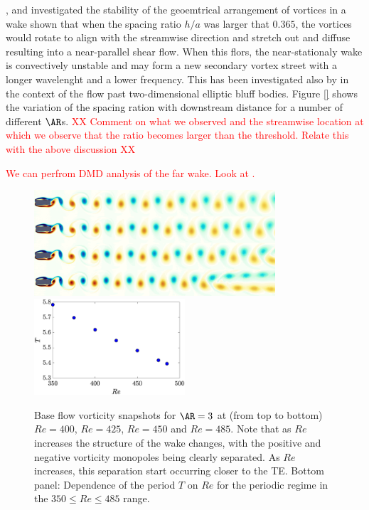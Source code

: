 \cite{durgin-karlsson-1971}, \cite{tsuboi-oshima-1985} and \cite{karasudani-funakoshi-1994} investigated the stability of the geoemtrical arrangement of vortices in a wake shown that when the spacing ratio $h/a$ was larger that $0.365$, the vortices would rotate to align with the streamwise direction and stretch out and diffuse resulting into a near-parallel shear flow. When this flors, the near-stationaly wake is convectively unstable and may form a new secondary vortex street with a longer wavelenght and a lower frequency. This has been investigated also by \cite{thompson-etal-2014} in the context of the flow past two-dimensional elliptic bluff bodies. Figure \ref{} shows the variation of the spacing ration with downstream distance for a number of different $\AR$s. \textcolor{red}{XX Comment on what we observed and the streamwise location at which we observe that the ratio becomes larger than the threshold. Relate this with the above discussion XX}


\textcolor{red}{We can perfrom DMD analysis of the far wake. Look at \cite{thompson-etal-2014}.}


\iffalse

\begin{figure}
  \centering
  \includegraphics[width=0.8\textwidth]{./fig/AR3/BF_vort_Re400_475.png}
  \includegraphics[width=0.5\textwidth]{./fig/AR3/T_Re.eps}
  \caption{Base flow vorticity snapshots for $\AR=3$ at (from top to bottom) $Re=400$, $Re=425$, $Re=450$ and $Re=485$. Note that as $Re$ increases the structure of the wake changes, with the positive and negative vorticity monopoles being clearly separated. As $Re$ increases, this separation start occurring closer to the TE. Bottom panel: Dependence of the period $T$ on $Re$ for the periodic regime in the $350 \le Re \le 485$ range.}
  \label{fig:BF_AR3}
\end{figure}

